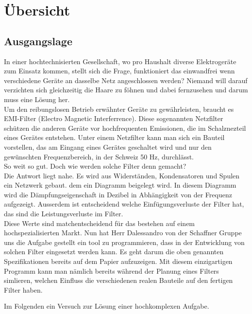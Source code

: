 \section{Übersicht} \label{sec:uebersicht}
\subsection{Ausgangslage}


In einer hochtechnisierten Gesellschaft, wo pro Haushalt diverse Elektrogeräte zum Einsatz kommen, stellt sich die Frage, funktioniert das einwandfrei wenn verschiedene Geräte an dasselbe Netz angeschlossen werden?
Niemand will darauf verzichten sich gleichzeitig die Haare zu föhnen und dabei fernzusehen und darum muss eine Lösung her. \\ Um den reibungslosen Betrieb erwähnter Geräte zu gewährleisten, braucht es EMI-Filter  (Electro Magnetic Interferrence). Diese sogenannten Netzfilter schützen die anderen Geräte vor hochfrequenten Emissionen, die im Schalznezteil eines Gerätes entstehen. Unter einem Netzfilter kann man sich ein Bauteil vorstellen, das am Eingang eines Gerätes geschaltet wird und nur den gewünschten Frequenzbereich, in der Schweiz 50 Hz, durchlässt. \\ So weit so gut. Doch wie werden solche Filter denn gemacht? \\
Die Antwort liegt nahe. Es wird aus Widerständen, Kondensatoren und Spulen ein Netzwerk gebaut. dem ein Diagramm beigelegt wird. In diesem Diagramm wird die Dämpfungseigenschaft in Dezibel in Abhängigkeit von der Frequenz aufgezeigt. Ausserdem ist entscheidend welche Einfügungsverluste der Filter hat, das sind die Leistungsverluste im Filter. \\ %

Diese Werte sind matchentscheidend für das bestehen auf einem hochspezialisierten Markt. 
Nun hat Herr Dalessandro von der Schaffner Gruppe uns die Aufgabe gestellt ein tool zu programmieren, dass in der Entwicklung von solchen Filter eingesetzt werden kann. Es geht darum die oben genannten Spezifikationen bereits auf dem Papier aufzuzeigen. Mit diesem einzigartigen Programm kann man nämlich bereits während der Planung eines Filters simlieren, welchen Einfluss die verschiedenen realen Bauteile auf den fertigen Filter haben.

Im Folgenden ein Versuch zur Lösung einer hochkomplexen Aufgabe. 
 


